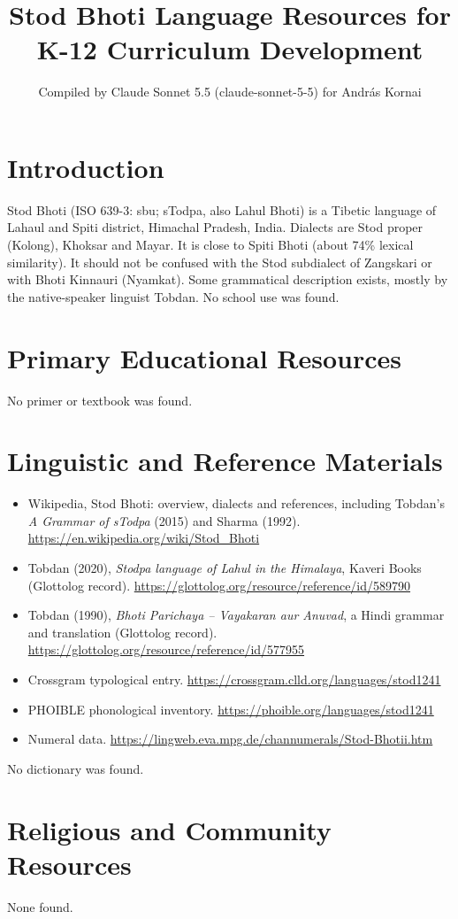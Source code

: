 \documentclass[12pt]{article}
\title{Stod Bhoti Language Resources for K-12 Curriculum Development}
\author{Compiled by Claude Sonnet 5.5 (claude-sonnet-5-5) for Andr\'as Kornai}
\date{}
\begin{document}
\maketitle

\section{Introduction}
Stod Bhoti (ISO 639-3: sbu; sTodpa, also Lahul Bhoti) is a Tibetic language of Lahaul and Spiti district, Himachal Pradesh, India. Dialects are Stod proper (Kolong), Khoksar and Mayar. It is close to Spiti Bhoti (about 74\% lexical similarity). It should not be confused with the Stod subdialect of Zangskari or with Bhoti Kinnauri (Nyamkat). Some grammatical description exists, mostly by the native-speaker linguist Tobdan. No school use was found.

\section{Primary Educational Resources}
No primer or textbook was found.

\section{Linguistic and Reference Materials}
\begin{itemize}
\item Wikipedia, Stod Bhoti: overview, dialects and references, including Tobdan's \emph{A Grammar of sTodpa} (2015) and Sharma (1992). \url{https://en.wikipedia.org/wiki/Stod_Bhoti}
\item Tobdan (2020), \emph{Stodpa language of Lahul in the Himalaya}, Kaveri Books (Glottolog record). \url{https://glottolog.org/resource/reference/id/589790}
\item Tobdan (1990), \emph{Bhoti Parichaya -- Vayakaran aur Anuvad}, a Hindi grammar and translation (Glottolog record). \url{https://glottolog.org/resource/reference/id/577955}
\item Crossgram typological entry. \url{https://crossgram.clld.org/languages/stod1241}
\item PHOIBLE phonological inventory. \url{https://phoible.org/languages/stod1241}
\item Numeral data. \url{https://lingweb.eva.mpg.de/channumerals/Stod-Bhotii.htm}
\end{itemize}
No dictionary was found.

\section{Religious and Community Resources}
None found.
\end{document}
